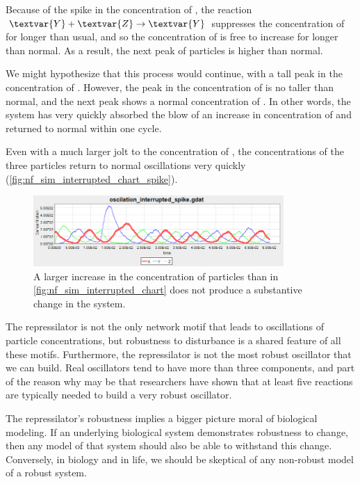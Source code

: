 Because of the spike in the concentration of , the reaction $\textvar{Y} + \textvar{Z} \rightarrow \textvar{Y}$ suppresses the concentration of  for longer than usual, and so the concentration of  is free to increase for longer than normal. As a result, the next peak of  particles is higher than normal.

We might hypothesize that this process would continue, with a tall peak in the concentration of . However, the peak in the concentration of  is no taller than normal, and the next peak shows a normal concentration of . In other words, the system has very quickly absorbed the blow of an increase in concentration of  and returned to normal within one cycle.

Even with a much larger jolt to the concentration of , the concentrations of the three particles return to normal oscillations very quickly (\autoref{fig:nf_sim_interrupted_chart_spike}).\\

\begin{figure}[h]
\centering
\mySfFamily
\includegraphics[width = 0.85\textwidth]{../images/nf_sim_interrupted_chart_spike.png}
\caption{A larger increase in the concentration of  particles than in \autoref{fig:nf_sim_interrupted_chart} does not produce a substantive change in the system.}
\label{fig:nf_sim_interrupted_chart_spike}
\end{figure}

The repressilator is not the only network motif that leads to oscillations of particle concentrations, but robustness to disturbance is a shared feature of all these motifs. Furthermore, the repressilator is not the most robust oscillator that we can build. Real oscillators tend to have more than three components, and part of the reason why may be that researchers have shown that at least five reactions are typically needed to build a very robust oscillator.

The repressilator's robustness implies a bigger picture moral of biological modeling. If an underlying biological system demonstrates robustness to change, then any model of that system should also be able to withstand this change. Conversely, in biology and in life, we should be skeptical of any non-robust model of a robust system.


